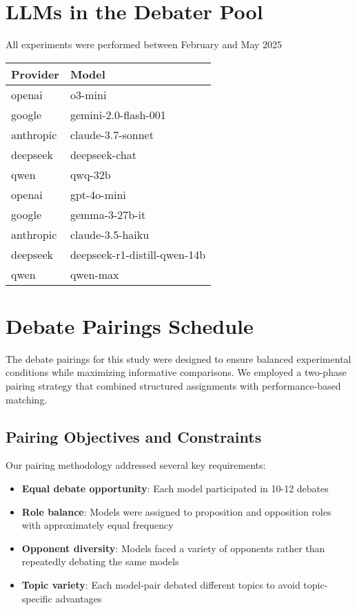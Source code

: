 \documentclass{article}
\begin{document}
\section{LLMs in the Debater Pool}
\label{appendix:llms}
All experiments were performed between February and May 2025
\begin{tabular}{|l|l|}
  \hline
  Provider & Model \\
  \hline
  openai & o3-mini \\
  google & gemini-2.0-flash-001 \\
  anthropic & claude-3.7-sonnet \\
  deepseek & deepseek-chat \\
  qwen & qwq-32b \\
  openai & gpt-4o-mini \\
  google & gemma-3-27b-it \\
  anthropic & claude-3.5-haiku \\
  deepseek & deepseek-r1-distill-qwen-14b \\
  qwen & qwen-max \\
  \hline
  \end{tabular}

  \section{Debate Pairings Schedule}
\label{appendix:pairings}
The debate pairings for this study were designed to ensure balanced experimental conditions while maximizing informative comparisons. We employed a two-phase pairing strategy that combined structured assignments with performance-based matching.


\subsection{Pairing Objectives and Constraints}
Our pairing methodology addressed several key requirements:
\begin{itemize}
\item \textbf{Equal debate opportunity}: Each model participated in 10-12 debates
\item \textbf{Role balance}: Models were assigned to proposition and opposition roles with approximately equal frequency
\item \textbf{Opponent diversity}: Models faced a variety of opponents rather than repeatedly debating the same models
\item \textbf{Topic variety}: Each model-pair debated different topics to avoid topic-specific advantages
\end{itemize}
\end{document}
